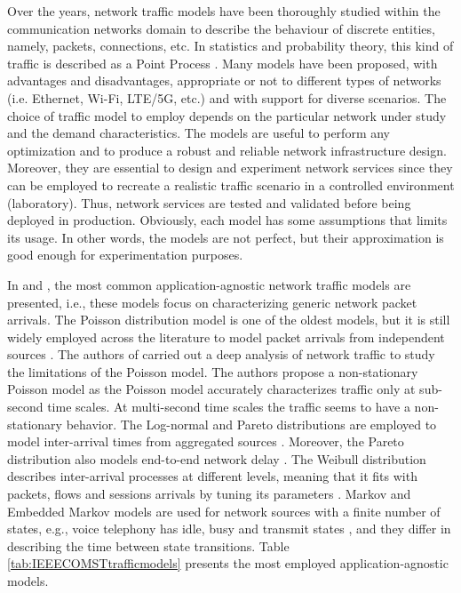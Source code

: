 Over the years, network traffic models have been thoroughly studied within the communication networks domain to describe the behaviour of discrete entities, namely, packets, connections, etc. In statistics and probability theory, this kind of traffic is described as a Point Process \cite{Daley2007}. Many models have been proposed, with advantages and disadvantages, appropriate or not to different types of networks (i.e. Ethernet, Wi-Fi, LTE/5G, etc.) and with support for diverse scenarios. 
The choice of traffic model to employ depends on the particular network under study and the demand characteristics. The models are useful to perform any optimization and to produce a robust and reliable network infrastructure design. Moreover, they are essential to design and experiment network services since they can be employed to recreate a realistic traffic scenario in a controlled environment (laboratory). Thus, network services are tested and validated before being deployed in production. Obviously, each model has some assumptions that limits its usage. In other words, the models are not perfect, but their approximation is good enough for experimentation purposes.

In \cite{Chandrasekaran2009} and \cite{Mohammed2011}, the most common application-agnostic network traffic models are presented, i.e., these models focus on characterizing generic network packet arrivals. The Poisson distribution model is one of the oldest models, but it is still widely employed across the literature to model packet arrivals from independent sources \cite{Guerin2003}. The authors of \cite{karagiannis2004} carried out a deep analysis of network traffic to study the limitations of the Poisson model. The authors propose a non-stationary Poisson model as the Poisson model accurately characterizes traffic only at sub-second time scales. At multi-second time scales the traffic seems to have a non-stationary behavior. The Log-normal and Pareto distributions are employed to model inter-arrival times from aggregated sources \cite{Bhattacharjee2010}. Moreover, the Pareto distribution also models end-to-end network delay \cite{Zhang2007}. The Weibull distribution describes inter-arrival processes at different levels, meaning that it fits with packets, flows and sessions arrivals by tuning its parameters \cite{Arfeen2013}. Markov and Embedded Markov models are used for network sources with a finite number of states, e.g., voice telephony has idle, busy and transmit states \cite{Adas1997}, and they differ in describing the time between state transitions. Table \ref{tab:IEEECOMSTtrafficmodels} presents the most employed application-agnostic models. 

